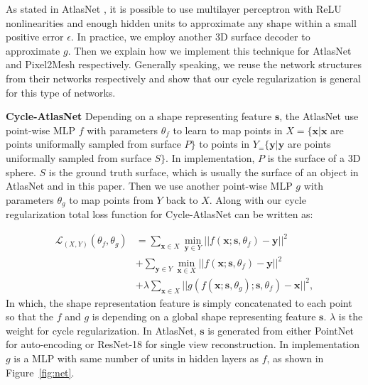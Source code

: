 As stated in AtlasNet \cite{atlasnet}, it is possible to use multilayer perceptron with ReLU nonlinearities and enough hidden units to approximate any shape within a small positive error $\epsilon$. In practice, we employ another 3D surface decoder to approximate $g$. Then we explain how we implement this technique for AtlasNet and Pixel2Mesh respectively. Generally speaking, we reuse the network structures from their networks respectively and show that our cycle regularization is general for this type of networks.

\noindent\textbf{Cycle-AtlasNet} Depending on a shape representing feature $\mathbf{s}$, the AtlasNet use point-wise MLP
$f$ with parameters $\theta_f$ to learn to map points in $X=\{\mathbf{x}| \mathbf{x}$ are points uniformally sampled from surface $P\}$ to points in $Y_=\{\mathbf{y}| \mathbf{y}$ are points uniformally sampled from surface $S\}$. In implementation, $P$ is the surface of a 3D sphere. $S$ is the ground truth surface, which is usually the surface of an object in AtlasNet \cite{atlasnet} and in this paper. Then we use another point-wise MLP $g$ with parameters $\theta_g$ to map points from $Y$ back to $X$. Along with our cycle regularization  total loss function for Cycle-AtlasNet can be written as:

\begin{equation}
\begin{aligned}
\label{equ:atlascycle}
\mathcal{L}_{(X,Y)}(\theta_f,\theta_g) &= \sum_{\mathbf{x} \in X} \min_{\mathbf{y} \in Y}|| f(\mathbf{x};\mathbf{s},\theta_f) - \mathbf{y} ||^2 \\ &+ \sum_{ \mathbf{y} \in Y}\min_{ \mathbf{x} \in X} || f(\mathbf{x};\mathbf{s},\theta_f) - \mathbf{y} ||^2 \\ &+ \lambda\sum_{\mathbf{x} \in X}||g(f(\mathbf{x};\mathbf{s},\theta_g);\mathbf{s},\theta_f) - \mathbf{x}||^2,
\end{aligned}
 \end{equation}
In which, the shape representation feature is simply concatenated to each point so that the $f$ and $g$ is depending on a global shape representing feature $\mathbf{s}$. $\lambda$ is the weight for cycle regularization. In AtlasNet, $\mathbf{s}$ is generated from either PointNet \cite{resnet} for auto-encoding or ResNet-18 \cite{resnet} for single view reconstruction. In implementation $g$ is a MLP with same number of units in hidden layers as $f$, as shown in Figure~\ref{fig:net}.

